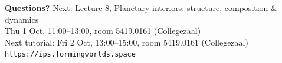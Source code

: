 \documentclass[aspectratio=169, 11pt]{beamer}
\begin{document}
\begin{frame}
  \vfill
  \begin{center}
    {\color{white}\Large\bfseries Questions?}
    \vskip20pt
    {\color{white!85}\large Next: Lecture 8, Planetary interiors: structure, composition \& dynamics}\\[4pt]
    {\color{white!85}\small Thu 1 Oct, 11:00--13:00, room 5419.0161 (Collegezaal)}\\[12pt]
    {\color{white!85}\small Next tutorial: Fri 2 Oct, 13:00--15:00, room 5419.0161 (Collegezaal)}\\[20pt]
    {\color{white!70}\small \texttt{https://ips.formingworlds.space}}
  \end{center}
  \vfill
\end{frame}
\end{document}

